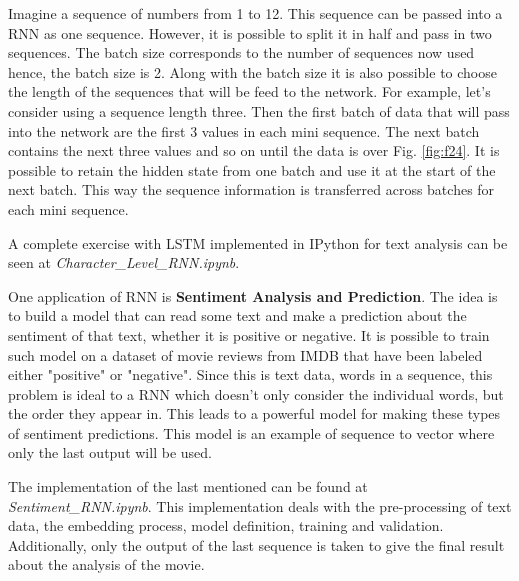 \documentclass{article}
\begin{document}
Imagine a sequence of numbers from 1 to 12. This sequence can be passed into a RNN as one sequence. However, it is possible to split it in half and pass in two sequences. The batch size corresponds to the number of sequences now used hence, the batch size is 2. Along with the batch size it is also possible to choose the length of the sequences that will be feed to the network. For example, let's consider using a sequence length three. Then the first batch of data that will pass into the network are the first 3 values in each mini sequence. The next batch contains the next three values and so on until the data is over Fig. \ref{fig:f24}. It is possible to retain the hidden state from one batch and use it at the start of the next batch. This way the sequence information is transferred across batches for each mini sequence.

A complete exercise with LSTM implemented in IPython for text analysis can be seen at \textit{Character\_Level\_RNN.ipynb}.

One application of RNN is \textbf{Sentiment Analysis and Prediction}. The idea is to build a model that can read some text and make a prediction about the sentiment of that text, whether it is positive or negative. It is possible to train such model on a dataset of movie reviews from IMDB that have been labeled either "positive" or "negative". Since this is text data, words in a sequence, this problem is ideal to a RNN which doesn't only consider the individual words, but the order they appear in. This leads to a powerful model for making these types of sentiment predictions. This model is an example of sequence to vector where only the last output will be used.

The implementation of the last mentioned can be found at \textit{Sentiment\_RNN.ipynb}. This implementation deals with the pre-processing of text data, the embedding process, model definition, training and validation. Additionally, only the output of the last sequence is taken to give the final result about the analysis of the movie. 




\printbibliography
\end{document}
